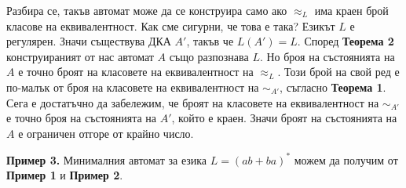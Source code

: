 \documentclass[openany]{book}
\begin{document}
            \hspace{15pt} Разбира се, такъв автомат може да се конструира само ако $\approx_L$
            има краен брой класове на еквивалентност. Как сме сигурни, че това е така? Езикът 
            $L$ е регулярен. Значи съществува ДКА $A'$, такъв че $L(A') = L$. Според 
            \textbf{Теорема 2} конструираният от нас автомат $A$ също разпознава $L$. Но 
            броя на състоянията на $A$ е точно броят на класовете на еквивалентност на 
            $\approx_L$. Този брой на свой ред е по-малък от броя на класовете на еквивалентност
            на $\sim_{A'}$, съгласно \textbf{Теорема 1}. Сега е достатъчно
            да забележим, че броят на класовете на еквивалентност на $\sim_{A'}$ е точно
            броя на състоянията на $A'$, който е краен. Значи броят на състоянията на $A$ е
            ограничен отгоре от крайно число.
        
            \vspace{15pt}
        
            \textbf{Пример 3.} Минималния автомат за езика $L = (ab + ba)^*$ можем да 
            получим от \textbf{Пример 1} и \textbf{Пример 2}. 
            
            \begin{center}
            \end{center}
             
            \vspace {15pt}
        
\end{document}
